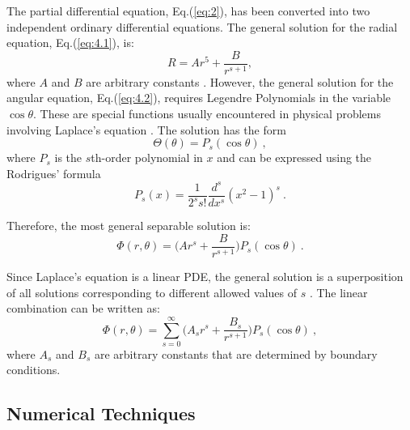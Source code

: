 \documentclass[a4paper]{jpconf}
\begin{document}
The partial differential equation, Eq.(\ref{eq:2}), has been converted into two independent ordinary differential equations. The general solution for the radial equation, Eq.(\ref{eq:4.1}), is:
\begin{equation}
R = Ar^5 + \frac{B}{r^{s+1}},
\end{equation} where $A$ and $B$ are arbitrary constants \cite{RHB-MathematicalMethods}. However, the general solution for the angular equation, Eq.(\ref{eq:4.2}), requires Legendre Polynomials in the variable $\cos \theta$. These are special functions usually encountered in physical problems involving Laplace's equation \cite{RHB-MathematicalMethods}. The solution has the form
\begin{equation}
\Theta(\theta) = P_{s}(\cos \theta)~,
\label{eq:5}
\end{equation} where $P_s$ is the $s$th-order polynomial in $x$ and can be expressed using the Rodrigues' formula \cite{RHB-MathematicalMethods}
\begin{equation}
P_s(x) = \frac{1}{2^s s!} \frac{d^s}{dx^s}(x^2 -1)^s~.
\label{eq:6}
\end{equation}

\noindent Therefore, the most general separable solution is:
\begin{equation}
\Phi(r, \theta) = \bigg(A r^s + \frac{B}{r^{s+1}}\bigg) P_s (\cos \theta)~.
\label{eq:7}
\end{equation}  

\noindent Since Laplace's equation is a linear PDE, the general solution is a superposition of all solutions corresponding to different allowed values of $s$ \cite{griffiths-introElec}. The linear combination can be written as:
\begin{equation}
\Phi(r, \theta) = \sum_{s=0}^{\infty} \bigg( A_s r^s + \frac{B_s}{r^{s+1}}\bigg) P_s (\cos \theta)~,
\label{eq:8}
\end{equation} where $A_s$ and $B_s$ are arbitrary constants that are determined by boundary conditions. \\ \par 

\subsection*{Numerical Techniques}
\end{document}
